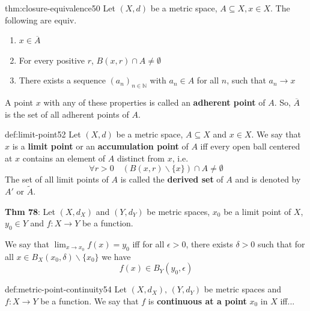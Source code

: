 \documentclass[landscape, 8pt]{extarticle}
\begin{document}
\begin{multicols}{3}
\begin{thm}{thm:closure-equivalence}{50}
    \vspace{-5pt}
    Let $(X, d)$ be a metric space, $A \subseteq X, x\in X$. The following are equiv.
    \vspace{-10pt}
    \begin{enumerate}
        \item $x\in\overline{A}$
        \item For every positive $r$, $B(x,r) \cap A \ne \emptyset$
        \item There exists a sequence $(a_{n})_{n\in \mathbb{N}}$ with $a_{n}\in A$ for all $n$, such that $a_{n}\to x$
    \end{enumerate}
    \vspace{-5pt}
    A point $x$ with any of these properties is called an \textbf{adherent point} of $A$. So, $\overline{A}$ is the set of all adherent points of $A$.
\end{thm}

\begin{dfn}{def:limit-point}{52}
    Let $(X, d)$ be a metric space, $A \subseteq X$ and $x\in X$. We say that $x$ is a \textbf{limit point} or an \textbf{accumulation point} of $A$ iff every open ball centered at $x$ contains an element of $A$ distinct from $x$, i.e.
    \[\forall r > 0 \quad (B(x,r) \backslash \{x\}) \cap A \ne \emptyset\]
    The set of all limit points of $A$ is called the \textbf{derived set} of $A$ and is denoted by $A'$ or $\tilde{A}$.

    \longrule{0.08ex}
    \textbf{Thm 78}: Let $(X, d_{X})$ and $(Y, d_{Y})$ be metric spaces, $x_{0}$ be a limit point of $X$, $y_{0}\in Y$ and $f : X \to Y$ be a function.

    We say that $\lim_{x\to x_{0}} f(x) = y_{0}$ iff for all $\epsilon > 0$, there exists $\delta > 0$ such that for all $x\in B_{X}(x_{0}, \delta) \backslash \{x_{0}\}$ we have
    \[f(x)\in B_{Y}(y_{0}, \epsilon)\]
\end{dfn}

\vspace{-5pt}
\begin{dfn}{def:metric-point-continuity}{54}
    \vspace{-5pt}
    Let $(X, d_{X}),\, (Y,d_{Y})$ be metric spaces and $f: X \to Y $ be a function. We say that $f$ is \textbf{continuous at a point} $x_{0}$ in $X$ iff...
    \vspace{-8pt}


\end{dfn}
\end{multicols}
\end{document}
